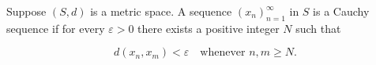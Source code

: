 Suppose $(S, d)$ is a metric space. A sequence $(x_n)_{n=1}^{\infty}$ in $S$ is a Cauchy sequence if for every $\varepsilon > 0$ there exists a positive integer $N$ such that

$$d(x_n, x_m) < \varepsilon \quad \text{whenever } n, m \geq N.$$
